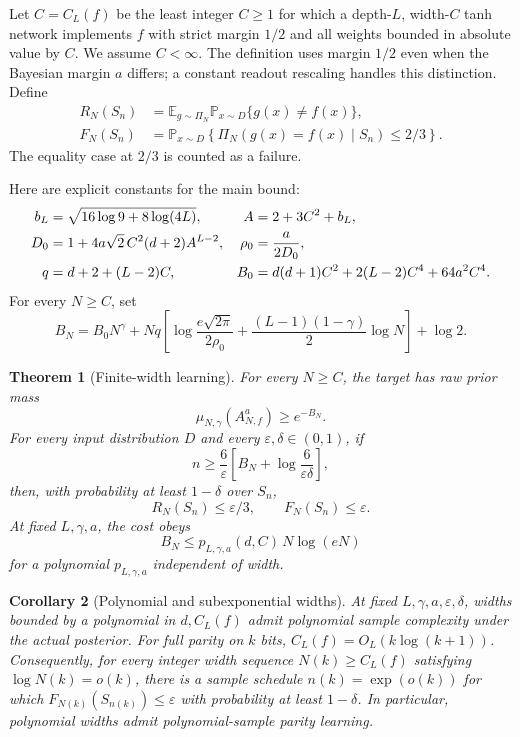\documentclass[11pt]{article}
\newtheorem{theorem}{Theorem}[section]\newtheorem{lemma}[theorem]{Lemma}
\newtheorem{corollary}[theorem]{Corollary}\newtheorem{proposition}[theorem]{Proposition}
\theoremstyle{remark}\newtheorem{remark}[theorem]{Remark}
\newcommand{\E}{\mathbb E}\newcommand{\PP}{\mathbb P}\newcommand{\R}{\mathbb R}
\begin{document}
Let $C=C_L(f)$ be the least integer $C\ge1$ for which a depth-$L$,
width-$C$ tanh network implements $f$ with strict margin $1/2$ and all
weights bounded in absolute value by $C$. We assume $C<\infty$.
The definition uses margin $1/2$ even when the Bayesian margin $a$ differs;
a constant readout rescaling handles this distinction.
Define
\begin{align*}
 R_N(S_n)&=\E_{g\sim\Pi_N}\PP_{x\sim D}\{g(x)\ne f(x)\},\\
 F_N(S_n)&=\PP_{x\sim D}\left\{
      \Pi_N(g(x)=f(x)\mid S_n)\le2/3\right\}.
\end{align*}
The equality case at $2/3$ is counted as a failure.

Here are explicit constants for the main bound:
\begin{align}
 b_L&=\sqrt{16\log9+8\log(4L)},&
 A&=2+3C^2+b_L,\notag\\
 D_0&=1+4a\sqrt2\,C^2(d+2)A^{L-2},&
 \rho_0&=\frac{a}{2D_0},\notag\\
 q&=d+2+(L-2)C,&
 B_0&=d(d+1)C^2+2(L-2)C^4+64a^2C^4.
 \label{eq:constants}
\end{align}
For every $N\ge C$, set
\begin{equation}\label{eq:cost}
 B_N=B_0N^\gamma
 +Nq\left[\log\frac{e\sqrt{2\pi}}{2\rho_0}
       +\frac{(L-1)(1-\gamma)}2\log N\right]+\log2.
\end{equation}

\begin{theorem}[Finite-width learning]\label{thm:learning}
For every $N\ge C$, the target has raw prior mass
\begin{equation}\label{eq:mass}
 \mu_{N,\gamma}(A_{N,f}^a)\ge e^{-B_N}.
\end{equation}
For every input distribution $D$ and every $\varepsilon,\delta\in(0,1)$,
if
\begin{equation}\label{eq:samples}
 n\ge\frac6\varepsilon
       \left[B_N+\log\frac6{\varepsilon\delta}\right],
\end{equation}
then, with probability at least $1-\delta$ over $S_n$,
\[
 R_N(S_n)\le\varepsilon/3,
 \qquad F_N(S_n)\le\varepsilon.
\]
At fixed $L,\gamma,a$, the cost obeys
\begin{equation}\label{eq:order}
 B_N\le p_{L,\gamma,a}(d,C)\,N\log(eN)
\end{equation}
for a polynomial $p_{L,\gamma,a}$ independent of width.
\end{theorem}

\begin{corollary}[Polynomial and subexponential widths]\label{cor:joint}
At fixed $L,\gamma,a,\varepsilon,\delta$, widths bounded by a polynomial
in $d,C_L(f)$ admit polynomial sample complexity under the actual posterior.
For full parity on $k$ bits, $C_L(f)=O_L(k\log(k+1))$.
Consequently, for every integer width sequence $N(k)\ge C_L(f)$ satisfying
$\log N(k)=o(k)$, there is a sample schedule $n(k)=\exp(o(k))$ for which
$F_{N(k)}(S_{n(k)})\le\varepsilon$ with probability at least $1-\delta$.
In particular, polynomial widths admit polynomial-sample parity learning.
\end{corollary}
\end{document}
